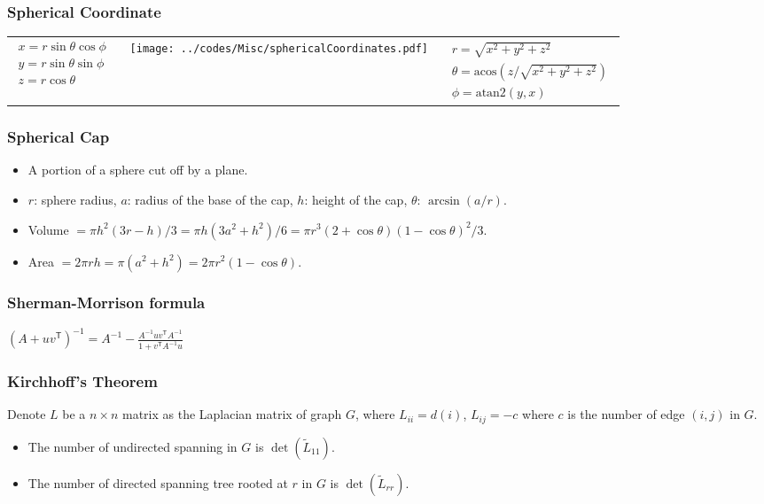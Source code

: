 \vspace{-0.5em}
\subsubsection{Spherical Coordinate}
\begin{tabular}{b{2.5cm}m{2cm}b{2.5cm}}
  {$\begin{aligned}
      x = r\sin\theta\cos\phi \\
      y = r\sin\theta\sin\phi \\
      z = r\cos\theta
  \end{aligned}$}
    &
    \hbox{
      \texttt{[image: ../codes/Misc/sphericalCoordinates.pdf]}
    }
    &
    {$\begin{aligned}
        r = \sqrt{x^2+y^2+z^2} \\
        \theta = \textrm{acos}(z/\sqrt{x^2+y^2+z^2}) \\
        \phi = \textrm{atan2}(y,x)
    \end{aligned}$}
\end{tabular}

\subsubsection{Spherical Cap}
\begin{itemize}
  \item A portion of a sphere cut off by a plane.
  \item $r$: sphere radius, $a$: radius of the base of the cap, $h$: height of the cap, $\theta$: $\arcsin(a/r)$.
  \item Volume $=\pi h^2(3r-h)/3=\pi h(3a^2+h^2)/6=\pi r^3(2+\cos\theta)(1-\cos\theta)^2/3$.
  \item Area $=2\pi rh=\pi(a^2+h^2)=2\pi r^2(1-\cos\theta)$.
\end{itemize}


\subsubsection{Sherman-Morrison formula}
$\left(A + uv^\textsf{T}\right)^{-1} = A^{-1} - \frac{A^{-1}uv^\textsf{T}A^{-1}}{1 + v^\textsf{T}A^{-1}u}$

\subsubsection{Kirchhoff's Theorem}
Denote $L$ be a $n \times n$ matrix as the Laplacian matrix of graph $G$, where $L_{ii} = d(i)$, $L_{ij} = -c$ where $c$ is the number of edge $(i, j)$ in $G$.
\begin{itemize}
    \item The number of undirected spanning in $G$ is $\det(\tilde{L}_{11})$.
    \item The number of directed spanning tree rooted at $r$ in $G$ is $\det(\tilde{L}_{rr})$.
\end{itemize}

